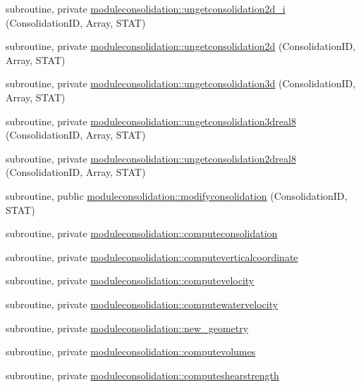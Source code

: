 \begin{DoxyCompactItemize}
\item 
subroutine, private \mbox{\hyperlink{namespacemoduleconsolidation_aeceaae1f01485ce743c8347e2a73399e}{moduleconsolidation\+::ungetconsolidation2d\+\_\+i}} (Consolidation\+ID, Array, S\+T\+AT)
\item 
subroutine, private \mbox{\hyperlink{namespacemoduleconsolidation_a9e7318abc8bb17ca00bd720c8eff021f}{moduleconsolidation\+::ungetconsolidation2d}} (Consolidation\+ID, Array, S\+T\+AT)
\item 
subroutine, private \mbox{\hyperlink{namespacemoduleconsolidation_affeed262d558e9c88366602767505b07}{moduleconsolidation\+::ungetconsolidation3d}} (Consolidation\+ID, Array, S\+T\+AT)
\item 
subroutine, private \mbox{\hyperlink{namespacemoduleconsolidation_a2dbd54c6dd99b8f825bc7223f4e88f8b}{moduleconsolidation\+::ungetconsolidation3dreal8}} (Consolidation\+ID, Array, S\+T\+AT)
\item 
subroutine, private \mbox{\hyperlink{namespacemoduleconsolidation_a72d92545dc323c3374c46a863489ab61}{moduleconsolidation\+::ungetconsolidation2dreal8}} (Consolidation\+ID, Array, S\+T\+AT)
\item 
subroutine, public \mbox{\hyperlink{namespacemoduleconsolidation_a0143c8577e56dbbb86e0db4d5927c316}{moduleconsolidation\+::modifyconsolidation}} (Consolidation\+ID, S\+T\+AT)
\item 
subroutine, private \mbox{\hyperlink{namespacemoduleconsolidation_ad7db155588df8bc22ff9b3934aff50f7}{moduleconsolidation\+::computeconsolidation}}
\item 
subroutine, private \mbox{\hyperlink{namespacemoduleconsolidation_ab28fd17bb7497eb19ebb09ffb2cef27b}{moduleconsolidation\+::computeverticalcoordinate}}
\item 
subroutine, private \mbox{\hyperlink{namespacemoduleconsolidation_a8045563d625e785b434b6daeaaf70a49}{moduleconsolidation\+::computevelocity}}
\item 
subroutine, private \mbox{\hyperlink{namespacemoduleconsolidation_a0237d190c26f864f2f6ab045a5f79795}{moduleconsolidation\+::computewatervelocity}}
\item 
subroutine, private \mbox{\hyperlink{namespacemoduleconsolidation_a1642d306f23b2cafb2dc89dde15f6e67}{moduleconsolidation\+::new\+\_\+geometry}}
\item 
subroutine, private \mbox{\hyperlink{namespacemoduleconsolidation_a1b4a867ed2aa36040fc524aad40a9778}{moduleconsolidation\+::computevolumes}}
\item 
subroutine, private \mbox{\hyperlink{namespacemoduleconsolidation_a461bd405c7105d5b33217ef55e3d96b2}{moduleconsolidation\+::computeshearstrength}}

\end{DoxyCompactItemize}
